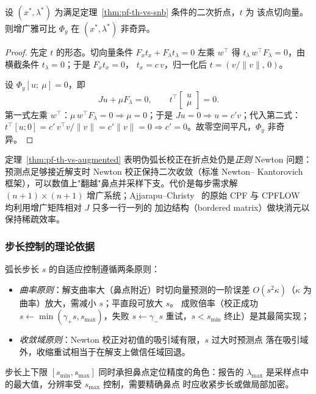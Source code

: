 \begin{theorem}[增广雅可比在二次折点非奇异]\label{thm:pf-th-vs-augmented}
设 $(x^*,\lambda^*)$ 为满足定理~\ref{thm:pf-th-vs-snb} 条件的二次折点，$t$ 为
该点切向量。则增广雅可比 $\Phi_y$ 在 $(x^*,\lambda^*)$ 非奇异。
\end{theorem}
\begin{proof}
先定 $t$ 的形态。切向量条件 $F_x t_x+F_\lambda t_\lambda=0$ 左乘 $w^{\top}$ 得
$t_\lambda\,w^{\top}F_\lambda=0$，由横截条件 $t_\lambda=0$；于是 $F_xt_x=0$，
$t_x=c\,v$，归一化后 $t=(v/\|v\|,\,0)$。

设 $\Phi_y[u;\ \mu]=0$，即
\begin{equation}
Ju+\mu F_\lambda=0,\qquad t^{\top}\begin{bmatrix}u\\ \mu\end{bmatrix}=0.
\end{equation}
第一式左乘 $w^{\top}$：$\mu\,w^{\top}F_\lambda=0\Rightarrow\mu=0$；于是
$Ju=0\Rightarrow u=c'v$；代入第二式：$t^{\top}[u;0]=c'\,v^{\top}v/\|v\|
=c'\|v\|=0\Rightarrow c'=0$。故零空间平凡，$\Phi_y$ 非奇异。
\end{proof}

\begin{remark}[校正的收敛性与实现含义]
定理~\ref{thm:pf-th-vs-augmented} 表明伪弧长校正在折点处仍是\emph{正则}
Newton 问题：预测点足够接近解支时 Newton 校正保持二次收敛（标准 Newton--
Kantorovich 框架），可以数值上"翻越"鼻点并采样下支。代价是每步需求解
$(n+1)\times(n+1)$ 增广系统；Ajjarapu--Christy~\cite{pfvs:ajjarapu} 的原始
CPF 与 CPFLOW~\cite{pfvs:chiang} 均利用增广矩阵相对 $J$ 只多一行一列的
加边结构（bordered matrix）做块消元以保持稀疏效率。
\end{remark}

\subsubsection{步长控制的理论依据}
弧长步长 $s$ 的自适应控制遵循两条原则：
\begin{itemize}
  \item \emph{曲率原则}：解支曲率大（鼻点附近）时切向量预测的一阶误差
        $O(s^{2}\kappa)$（$\kappa$ 为曲率）放大，需减小 $s$；平直段可放大 $s$。
        成败倍率（校正成功 $s\leftarrow\min(\gamma_{+}s,s_{\max})$，失败
        $s\leftarrow\gamma_{-}s$ 重试，$s<s_{\min}$ 终止）是其最简实现；
  \item \emph{收敛域原则}：Newton 校正对初值的吸引域有限，$s$ 过大时预测点
        落在吸引域外，收缩重试相当于在解支上做信任域回退。
\end{itemize}
步长上下限 $[s_{\min},s_{\max}]$ 同时承担鼻点定位精度的角色：报告的
$\lambda_{\max}$ 是采样点中的最大值，分辨率受 $s_{\max}$ 控制，需要精确鼻点
时应收紧步长或做局部加密。

